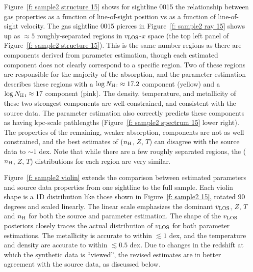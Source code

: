 \documentclass[fleqn,usenatbib]{mnras}
\begin{document}
Figure~\ref{f: sample2 structure 15} shows for sightline 0015 the relationship between gas properties as a function of line-of-sight position vs as a function of line-of-sight velocity.
The gas sightline 0015 pierces in Figure~\ref{f: sample2 ray 15} shows up as $\approx 5$ roughly-separated regions in $v_{\rm LOS}$-$x$ space (the top left panel of Figure~\ref{f: sample2 structure 15}).
This is the same number regions as there are components derived from parameter estimation,
though each estimated component does not clearly correspond to a specific region.
Two of these regions are responsible for the majority of the  absorption,
and the parameter estimation describes these regions with a $\log N_{\ion{H}{I}} \approx 17.2$ component (yellow) and a $\log N_{\ion{H}{I}} \approx 17$ component (pink).
The density, temperature, and metallicity of these two strongest components are well-constrained, and consistent with the source data.
The parameter estimation also correctly predicts these components as having kpc-scale pathlengths (Figure~\ref{f: sample2 spectrum 15} lower right).
The properties of the remaining, weaker absorption, components are not as well constrained, and the best estimates of ($n_{\rm H}$, $Z$, $T$) can disagree with the source data to $\sim 1$ dex.
Note that while there are a few roughly separated regions, the ($n_{\rm H}$, $Z$, $T$) distributions for each region are very similar.

Figure~\ref{f: sample2 violin} extends the comparison between estimated parameters and source data properties from one sightline to the full sample.
Each violin shape is a 1D distribution like those shown in Figure~\ref{f: sample2 15}, rotated 90 degrees and scaled linearly.
The linear scale emphasizes the dominant $v_{\rm LOS}$, $Z$, $T$ and $n_{\rm H}$ for both the source and parameter estimation.
The shape of the $v_{\rm LOS}$ posteriors closely traces the actual distribution of $v_{\rm LOS}$ for both parameter estimations.
The metallicity is accurate to within $\lesssim 1$ dex,
and the temperature and density are accurate to within $\lesssim 0.5$ dex.
Due to changes in the redshift at which the synthetic data is ``viewed'', the revised estimates are in better agreement with the source data,
as discussed below.
\end{document}
